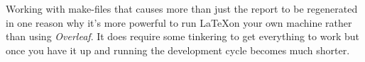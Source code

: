 \documentclass[a4paper,11pt]{article}
\begin{document}
Working with make-files that causes more than just the report to be
regenerated in one reason why it's more powerful to run \LaTeX on your
own machine rather than using {\em Overleaf}. It does require some
tinkering to get everything to work but once you have it up and running
the development cycle becomes much shorter.
\end{document}
